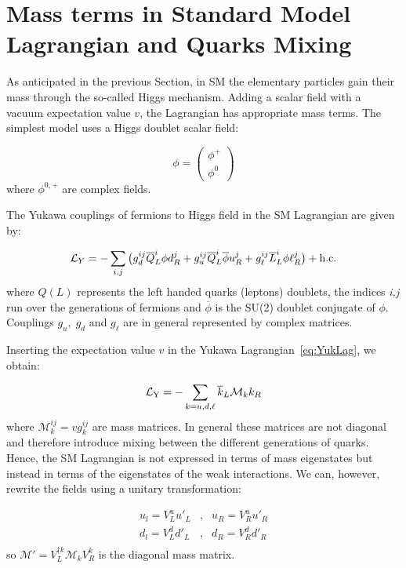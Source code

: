 \section{Mass terms in Standard Model Lagrangian and Quarks Mixing}
\label{sec:MassTermsSML}
As anticipated in the previous Section, in SM the elementary particles gain their mass through 
the so-called Higgs mechanism.
Adding a scalar field with a vacuum expectation value  $v$, the Lagrangian 
has appropriate mass terms.
The simplest model uses a Higgs doublet scalar field:

\begin{equation}
\phi=\left( \begin{array}{c}
\phi^{+} \\
\phi^{0}
\end{array} \right)
\label{eq:HiggsDoublet}
\end{equation}
where $\phi^{0,+}$ are complex fields.

The Yukawa couplings of fermions to Higgs field in the SM
 Lagrangian are given by:

\begin{equation}
\mathcal{L}_Y = - \sum_{i,j}\big(g^{ij}_d\overline Q_L^{i}\phi d_R^{j}
+ g^{ij}_u \overline Q_L^{i}\overline\phi u_R^{j} 
+ g^{ij}_{\ell} \overline L_L^{i}\phi\ell^j_R\big)+\rm{h.c.} 
\label{eq:YukLag}
\end{equation}
where $Q(L)$ represents the left handed quarks (leptons) doublets, the
 indices {\it i,j} run over the generations of fermions and
 $\overline \phi$ is the SU(2) doublet conjugate of $\phi$.
Couplings $g_u,\;g_d$ and $g_{\ell}$ are in general represented by
 complex matrices.

Inserting the expectation value $v$ in the Yukawa
 Lagrangian~\ref{eq:YukLag}, we obtain:

\begin{equation}
\mathcal{L}_{\rm{Y}} = - \sum_{k=u,d,\ell} \overline k_L\mathcal{M}_k k_R
\label{eq:YukLagExp}
\end{equation}
where $\mathcal{M}_k^{ij} = vg_k^{ij}$ are mass matrices. In general these 
matrices are not diagonal and  therefore introduce mixing between the
 different generations of quarks. Hence, the
 SM Lagrangian is not expressed in terms of mass eigenstates but instead
in terms of the eigenstates of the weak interactions.
   We can, however, rewrite the fields using a unitary transformation:

\begin{equation}
\begin{array}{ccc}
u_l = V^u_L u'_L & , & u_R = V^u_R u'_R \\
d_l = V^d_L d'_L & , & d_R = V^d_R d'_R \\
\label{eq:MatrRot}
\end{array}
\end{equation}
so $\mathcal{M}'=V^{\dagger k}_L\mathcal{M}_kV_R^k$ is the diagonal mass
 matrix.





